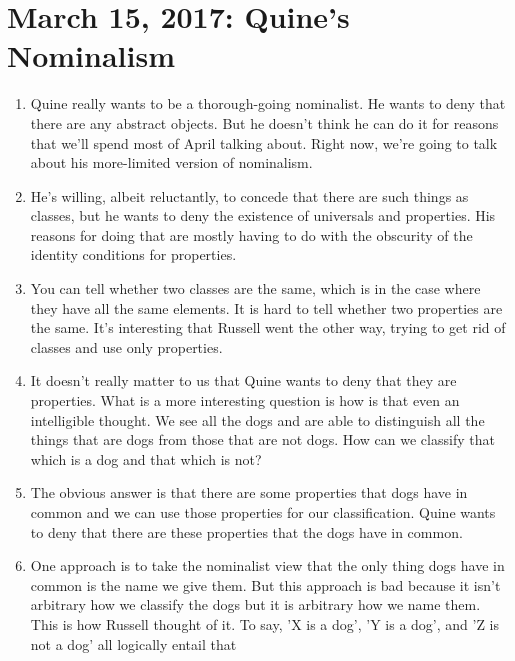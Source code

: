 \documentclass[12pt]{article}
\theoremstyle{definition}
\begin{document}
\begin{enumerate}
\end{enumerate}

\section{March 15, 2017: Quine's Nominalism}

\begin{enumerate}
    \itemsep0em 
    \item 
        Quine really wants to be a thorough-going nominalist. He wants to deny
        that there are any abstract objects. But he doesn't think he can do it
        for reasons that we'll spend most of April talking about. Right now,
        we're going to talk about his more-limited version of nominalism. 
    \item
        He's willing, albeit reluctantly, to concede that there are such things
        as classes, but he wants to deny the existence of universals and
        properties. His reasons for doing that are mostly having to do with the
        obscurity of the identity conditions for properties.
    \item
        You can tell whether two classes are the same, which is in the case
        where they have all the same elements. It is hard to tell whether two
        properties are the same. It's interesting that Russell went the other
        way, trying to get rid of classes and use only properties.
    \item
        It doesn't really matter to us that Quine wants to deny that they are
        properties. What is a more interesting question is how is that even an
        intelligible thought. We see all the dogs and are able to distinguish
        all the things that are dogs from those that are not dogs. How can we
        classify that which is a dog and that which is not? 
    \item
        The obvious answer is that there are some properties that dogs have in
        common and we can use those properties for our classification. Quine
        wants to deny that there are these properties that the dogs have in
        common. 
    \item
        One approach is to take the nominalist view that the only thing dogs
        have in common is the name we give them. But this approach is bad
        because it isn't arbitrary how we classify the dogs but it is arbitrary
        how we name them. This is how Russell thought of it. To say, 'X is a
        dog', 'Y is a dog', and 'Z is not a dog' all logically entail that

\end{enumerate}
\end{document}
